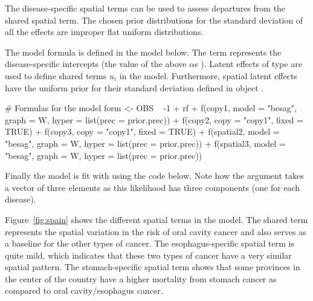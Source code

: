 The disease-specific spatial terms can be used to assess departures from the shared spatial term. The chosen prior distributions for the standard deviation of all the effects are improper flat uniform distributions.

The model formula is defined in the model below. The  term represents the disease-specific intercepts (the value of the above $\alpha$s ). Latent effects of type  \citep[see, for example, Section 6.5.1 in][]{gomez2020bayesian} are used to define shared terms  $u_i$ in the model. Furthermore, spatial latent effects have the uniform prior for their standard deviation defined in object .

\begin{example*}
# Formulas for the model
form <- OBS ~ -1 + rf +
  f(copy1, model = "besag", graph = W, hyper = list(prec = prior.prec)) +
  f(copy2, copy = "copy1", fixed = TRUE) +
  f(copy3, copy = "copy1", fixed = TRUE) +
  f(spatial2, model = "besag", graph = W, hyper = list(prec = prior.prec)) +
  f(spatial3, model = "besag", graph = W, hyper = list(prec = prior.prec))
\end{example*}

Finally the model is fit with  using the code below. Note how the  argument takes a vector of three elements as this likelihood has three components (one for each disease).


Figure~\ref{fig:spain} shows the different spatial terms in the model. The shared term represents the spatial variation in the risk of oral cavity cancer and also serves as a baseline for the other types of cancer. The esophagus-specific spatial term is quite mild, which indicates that these two types of cancer have a very similar spatial pattern. The stomach-specific spatial term shows that some provinces in the center of the country have a higher mortality from stomach cancer as compared to oral cavity/esophagus cancer.


